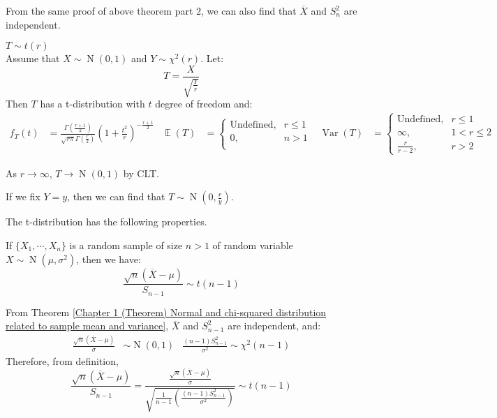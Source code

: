 \documentclass{huhtakm-template-book-v2}
\DeclareMathOperator{\E}{\mathbb{E}}
\DeclareMathOperator{\Var}{Var}
\DeclareMathOperator{\N}{N}
\begin{document}
\begin{rem}
	From the same proof of above theorem part 2, we can also find that $\overline{X}$ and $S_{n}^{2}$ are independent.
\end{rem}
\begin{eg} $T\sim t(r)$\\
	Assume that $X\sim\N(0,1)$ and $Y\sim\chi^{2}(r)$. Let:
	\begin{equation*}
		T=\frac{X}{\sqrt{\frac{Y}{r}}}
	\end{equation*}
	Then $T$ has a t-distribution with $t$ degree of freedom and:
	\begin{align*}
		f_{T}(t)&=\frac{\Gamma\left(\frac{r+1}{2}\right)}{\sqrt{r\pi}\Gamma\left(\frac{r}{2}\right)}\left(1+\frac{t^{2}}{r}\right)^{-\frac{r+1}{2}} & \E(T)&=\begin{cases}
			\text{Undefined}, &r\leq 1\\
			0, &n>1\\
		\end{cases} & \Var(T)&=\begin{cases}
			\text{Undefined}, &r\leq 1\\
			\infty, &1<r\leq 2\\
			\frac{r}{r-2}, &r>2
		\end{cases}
	\end{align*}
\end{eg}
\begin{rem}
	As $r\to\infty$, $T\to\N(0,1)$ by CLT.
\end{rem}
\begin{rem}
	If we fix $Y=y$, then we can find that $T\sim\N(0,\frac{r}{y})$.
\end{rem}
The t-distribution has the following properties.
\begin{thm}
	If $\{X_{1},\cdots,X_{n}\}$ is a random sample of size $n>1$ of random variable $X\sim\N(\mu,\sigma^{2})$, then we have:
	\begin{equation*}
		\frac{\sqrt{n}(\overline{X}-\mu)}{S_{n-1}}\sim t(n-1)
	\end{equation*}
\end{thm}
\begin{proofing}
	From Theorem \ref{Chapter 1 (Theorem) Normal and chi-squared distribution related to sample mean and variance}, $\overline{X}$ and $S_{n-1}^{2}$ are independent, and:
	\begin{align*}
		\frac{\sqrt{n}(\overline{X}-\mu)}{\sigma}&\sim\N(0,1) & \frac{(n-1)S_{n-1}^{2}}{\sigma^{2}}\sim\chi^{2}(n-1)
	\end{align*}
	Therefore, from definition,
	\begin{equation*}
		\frac{\sqrt{n}(\overline{X}-\mu)}{S_{n-1}}=\frac{\frac{\sqrt{n}(\overline{X}-\mu)}{\sigma}}{\sqrt{\frac{1}{n-1}\left(\frac{(n-1)S_{n-1}^{2}}{\sigma^{2}}\right)}}\sim t(n-1)
	\end{equation*}
\end{proofing}
\end{document}
